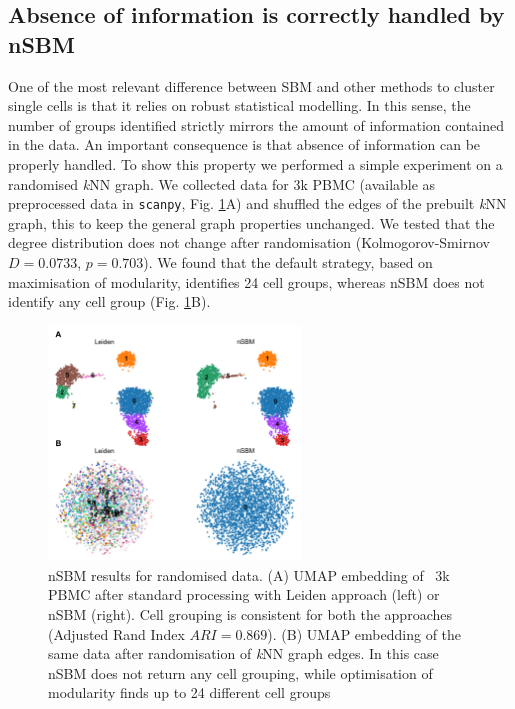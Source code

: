 \documentclass[10pt]{article}
\begin{document}

\subsection*{Absence of information is correctly handled by nSBM}

One of the most relevant difference between SBM and other methods to cluster single cells is that it relies on robust statistical modelling. In this sense, the number of groups identified strictly mirrors the amount of information contained in the data. An important consequence is that absence of information can be properly handled. To show this property we performed a simple experiment on a randomised \emph{k}NN graph. We collected data for 3k PBMC (available as preprocessed data in \texttt{scanpy}, Fig. \ref{FigureRandom}A) and shuffled the edges of the prebuilt \emph{k}NN graph, this to keep the general graph properties unchanged. We tested that the degree distribution does not change after randomisation (Kolmogorov-Smirnov $D=0.0733$, $p=0.703$). We found that the default strategy, based on maximisation of modularity, identifies 24 cell groups, whereas nSBM does not identify any cell group (Fig. \ref{FigureRandom}B). 

\begin{figure}[H]
\centering
\includegraphics[keepaspectratio,width=0.6\textwidth,height=\textheight]{FIgure_Random.png}
\caption[]{nSBM results for randomised data. (A) UMAP embedding of ~3k PBMC after standard processing with Leiden approach (left) or nSBM (right). Cell grouping is consistent for both the approaches (Adjusted Rand Index $ARI=0.869$). (B) UMAP embedding of the same data after randomisation of \emph{k}NN graph edges. In this case nSBM does not return any cell grouping, while optimisation of modularity finds up to 24 different cell groups}\label{FigureRandom}
\end{figure}
\end{document}
